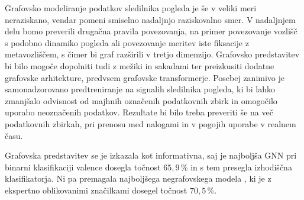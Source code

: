 Grafovsko modeliranje podatkov sledilnika pogleda je še v veliki meri neraziskano, vendar pomeni smiselno nadaljnjo raziskovalno smer.
V nadaljnjem delu bomo preverili drugačna pravila povezovanja, na primer povezovanje vozlišč s podobno dinamiko pogleda ali povezovanje meritev iste fiksacije z metavozliščem, s čimer bi graf razširili v tretjo dimenzijo.
Grafovsko predstavitev bi bilo mogoče dopolniti tudi z mežiki in sakadami ter preizkusiti dodatne grafovske arhitekture, predvsem grafovske transformerje.
Posebej zanimivo je samonadzorovano predtreniranje na signalih sledilnika pogleda, ki bi lahko zmanjšalo odvisnost od majhnih označenih podatkovnih zbirk in omogočilo uporabo neoznačenih podatkov.
Rezultate bi bilo treba preveriti še na več podatkovnih zbirkah, pri prenosu med nalogami in v pogojih uporabe v realnem času.

Grafovska predstavitev se je izkazala kot informativna, saj je najboljša GNN pri binarni klasifikaciji valence dosegla točnost $65{,}9\,\%$ in s tem presegla izhodiščna klasifikatorja.
Ni pa premagala najboljšega negrafovskega modela , ki je z ekspertno oblikovanimi značilkami dosegel točnost $70{,}5\,\%$.

